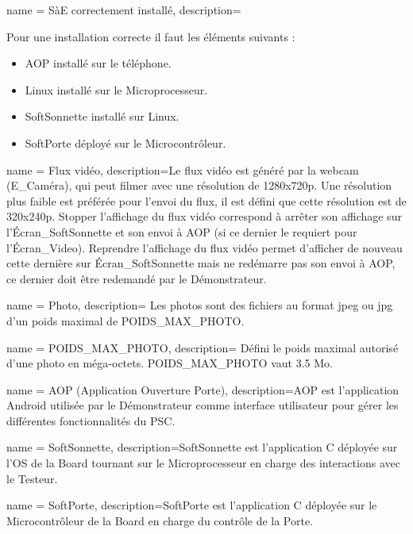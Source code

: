 {
    name = {SàE correctement installé},
    description={\hypertarget{install}{}Pour une installation correcte il faut les éléments suivants :
    \begin{itemize}
        \item AOP installé sur le téléphone.
        \item Linux installé sur le Microprocesseur. 
        \item SoftSonnette installé sur Linux.
        \item SoftPorte déployé sur le Microcontrôleur.
    \end{itemize}
    }
}

{
    name = {Flux vidéo},
    description={\hypertarget{video}{}Le flux vidéo est généré par la webcam (E\_Caméra), qui peut filmer avec une résolution de 1280x720p.
    Une résolution plus faible est préférée pour l'envoi du flux, il est défini que cette résolution est de 320x240p.  
    Stopper l'affichage du flux vidéo correspond à arrêter son affichage sur l'Écran\_SoftSonnette et son envoi à AOP (si ce dernier le requiert pour l'Écran\_Video).
    Reprendre l'affichage du flux vidéo permet d'afficher de nouveau cette dernière sur Écran\_SoftSonnette mais ne redémarre pas son envoi à AOP, ce dernier doit être redemandé par le Démonstrateur.
    }
}

{
    name = {Photo},
    description={\hypertarget{photo}{}%
    Les photos sont des fichiers au format jpeg ou jpg d'un poids maximal de POIDS\_MAX\_PHOTO.
    }
}

{
    name = {POIDS\_MAX\_PHOTO},
    description={\hypertarget{poidsPhoto}{} Défini le poids maximal autorisé d'une photo en méga-octets.
    POIDS\_MAX\_PHOTO vaut 3.5 Mo.
    }
}

{
    name = {AOP (Application Ouverture Porte)},
    description={\hypertarget{Aop}{}AOP est l'application Android utilisée par le Démonstrateur comme interface utilisateur pour gérer les différentes fonctionnalités du PSC.
    }
}

{
    name = {SoftSonnette},
    description={\hypertarget{SoftSonnette}{}SoftSonnette est l'application C déployée sur l'OS de la Board tournant sur le Microprocesseur en charge des interactions avec le Testeur.
    }
}

{
    name = {SoftPorte},
    description={\hypertarget{SoftPorte}{}SoftPorte est l'application C déployée sur le Microcontrôleur de la Board en charge du contrôle de la Porte.
    }
}


